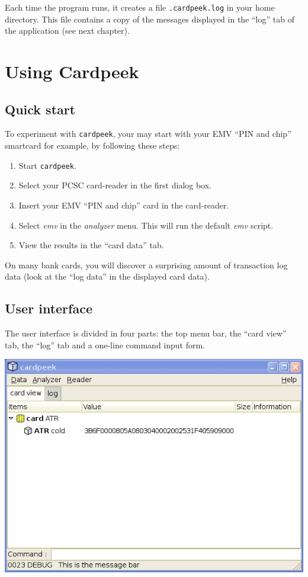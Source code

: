 \documentclass[11pt]{report}
\begin{document}
Each time the program runs, it creates a file \texttt{.cardpeek.log} in your home directory.
This file contains a copy of the messages displayed in the ``log'' tab of the application (see next chapter). 

\chapter{Using Cardpeek}

\section{Quick start}

To experiment with \texttt{cardpeek}, your may start with your EMV ``PIN and chip'' smartcard for example, by following these steps:
\begin{enumerate}
\item{Start \texttt{cardpeek}.}
\item{Select your PCSC card-reader in the first dialog box.}
\item{Insert your EMV ``PIN and chip'' card in the card-reader.}
\item{Select \emph{emv} in the \emph{analyzer} menu. This will run the default \emph{emv} script.}
\item{View the results in the ``card data'' tab.}
\end{enumerate}

On many bank cards, you will discover a surprising amount of transaction log data (look at the ``log data'' in the displayed card data).

\section{User interface}

The user interface is divided in four parts: the top menu bar, the ``card view'' tab, the ``log'' tab and a one-line command input form.

\begin{center}
\includegraphics[width=.75\textwidth]{graphics/sample-blank.jpg}
\end{center}
\end{document}
